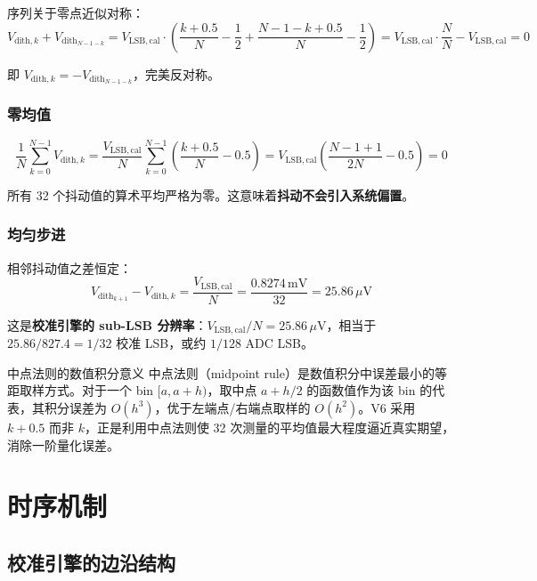 \documentclass[UTF8,a4paper,11pt]{ctexart}
\newcommand{\Vlsb}{V_{\mathrm{LSB,cal}}}
\newcommand{\Vdith}{V_{\mathrm{dith}}}
\begin{document}
序列关于零点近似对称：
\begin{equation}
V_{\mathrm{dith},k} + \Vdith_{N-1-k} = \Vlsb \cdot \left(\frac{k+0.5}{N} - \frac{1}{2} + \frac{N-1-k+0.5}{N} - \frac{1}{2}\right) = \Vlsb \cdot \frac{N}{N} - \Vlsb = 0
\end{equation}

即 $V_{\mathrm{dith},k} = -\Vdith_{N-1-k}$，完美反对称。

\subsubsection{零均值}

\begin{equation}
\frac{1}{N}\sum_{k=0}^{N-1} V_{\mathrm{dith},k} = \frac{\Vlsb}{N}\sum_{k=0}^{N-1}\left(\frac{k+0.5}{N} - 0.5\right) = \Vlsb\left(\frac{N-1+1}{2N} - 0.5\right) = 0
\end{equation}

所有 32 个抖动值的算术平均严格为零。这意味着\textbf{抖动不会引入系统偏置}。

\subsubsection{均匀步进}

相邻抖动值之差恒定：
\begin{equation}
\Vdith_{k+1} - V_{\mathrm{dith},k} = \frac{\Vlsb}{N} = \frac{0.8274\,\mathrm{mV}}{32} = 25.86\,\mu\mathrm{V}
\end{equation}

这是\textbf{校准引擎的 sub-LSB 分辨率}：$\Vlsb / N = 25.86\,\mu\mathrm{V}$，相当于 $25.86 / 827.4 = 1/32$ 校准 LSB，或约 $1/128$ ADC LSB。

\begin{tipbox}{中点法则的数值积分意义}
中点法则（midpoint rule）是数值积分中误差最小的等距取样方式。对于一个 bin $[a, a+h)$，取中点 $a + h/2$ 的函数值作为该 bin 的代表，其积分误差为 $O(h^3)$，优于左端点/右端点取样的 $O(h^2)$。V6 采用 $k + 0.5$ 而非 $k$，正是利用中点法则使 32 次测量的平均值最大程度逼近真实期望，消除一阶量化误差。
\end{tipbox}

\section{时序机制}

\subsection{校准引擎的边沿结构}
\end{document}
